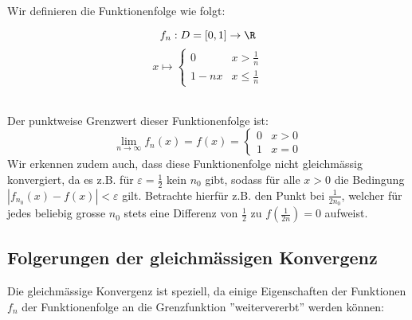 \begin{example}\label{ex_grenzfunktion} Wir definieren die Funktionenfolge wie folgt:

\begin{minipage}[c]{0.4\linewidth}
$$f_n: D=[0,1] \to \R$$
$$x \mapsto \begin{cases} 0 & x >\frac{1}{n} \\ 1-nx & x \leq \frac{1}{n}\end{cases}$$\\
\end{minipage}
\hspace{2em}
\begin{minipage}[]{0.4\linewidth}
\end{minipage}\hfill

Der punktweise Grenzwert dieser Funktionenfolge ist:
$$ \lim_{n \to \infty} f_n(x) = f(x) = \begin{cases} 0 & x >0 \\ 1 & x = 0\end{cases}$$
Wir erkennen zudem auch, dass diese Funktionenfolge nicht gleichmässig konvergiert, da es z.B. für $\varepsilon = \frac{1}{2}$ kein $n_0$ gibt, sodass für alle $x > 0$ die Bedingung $|f_{n_0}(x)-f(x)| < \varepsilon$ gilt. Betrachte hierfür z.B. den Punkt bei $\frac{1}{2n_0}$, welcher für jedes beliebig grosse $n_0$ stets eine Differenz von $\frac{1}{2}$ zu $f(\frac{1}{2n}) = 0$ aufweist.
\end{example}

\subsection{Folgerungen der gleichmässigen Konvergenz}

Die gleichmässige Konvergenz ist speziell, da einige Eigenschaften der Funktionen $f_n$ der Funktionenfolge an die Grenzfunktion ''weitervererbt'' werden können:

